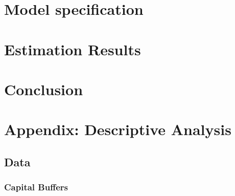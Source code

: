 \documentclass[
]{article}
\begin{document}
\citet{altunbas2004bank}

\citet{gambacorta2018bank}

\citet{berrospide2010effects}

\hypertarget{model-specification}{%
\section{Model specification}\label{model-specification}}

\hypertarget{estimation-results}{%
\section{Estimation Results}\label{estimation-results}}

\hypertarget{conclusion}{%
\section{Conclusion}\label{conclusion}}

\newpage

\hypertarget{appendix-descriptive-analysis}{%
\section{Appendix: Descriptive Analysis}\label{appendix-descriptive-analysis}}

\hypertarget{data}{%
\subsection{Data}\label{data}}

\hypertarget{capital-buffers}{%
\subsubsection{Capital Buffers}\label{capital-buffers}}
\end{document}
